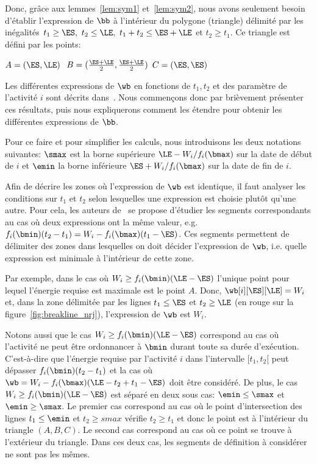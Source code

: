 Donc, grâce aux lemmes~\ref{lem:sym1} et~\ref{lem:sym2}, nous avons
seulement besoin d'établir l'expression de $\bb$ à l'intérieur du
polygone (triangle) délimité par les inégalités $t_1 \ge \ES, \ t_2
\le \LE,\ t_1+t_2 \le \ES+\LE$ et $ t_2 \ge t_1$. Ce triangle est
défini par les points:

$A=(\ES,\LE)$ \hfill $\ B=(\frac{\ES+\LE}{2},\frac{\ES+\LE}{2})$
\hfill $C=( \ES,\ES)$

Les différentes expressions de $\wb$ en fonctions de $t_1,t_2$ et des
paramètre de l'activité $i$ sont décrits
dans~\cite{ArtiguesLopez}. Nous commençons donc par brièvement
présenter ces résultats, puis nous expliquerons comment les étendre
pour obtenir les différentes expressions de $\bb$.

Pour ce faire et pour simplifier les calculs, nous introduisons les
deux notations suivantes: $\smax$ est la borne supérieure $ \LE -
W_i/f_i(\bmax)$ sur la date de début de $i$ et $\emin$ la borne
inférieure $\ES + W_i/f_i(\bmax)$ sur la date de fin de $i$. 

Afin de décrire les zones où l'expression de $\wb$ est identique, il
faut analyser les conditions sur $t_1$ et $t_2$ selon lesquelles une
expression est choisie plutôt qu'une autre. Pour cela, les auteurs
de~\cite{ArtiguesLopez} se propose d'étudier les segments
correspondants au cas où deux expressions ont la même valeur,
e.g. $f_i(\bmin)(t_2-t_1) = W_i - f_i(\bmax) (t_1-\ES)$. Ces segments
permettent de délimiter des zones dans lesquelles on doit décider
l'expression de $\wb$, i.e. quelle expression est minimale à
l'intérieur de cette zone. 

Par exemple, dans le cas où $W_i \ge f_i(\bmin)(\LE -\ES)$ l'unique
point pour lequel l'énergie requise est maximale est le point
$A$. Donc, $\wb[i][\ES][\LE]= W_i$ et, dans la zone délimitée par les
lignes $t_1 \le \ES$ et $t_2 \ge \LE$ (en rouge sur la
figure~\ref{fig:breakline_nrj}), l'expression de $\wb$ est $W_i$. 

Notons aussi que le cas $W_i \ge f_i(\bmin)(\LE -\ES)$ correspond au
cas où l'activité ne peut être ordonnancer à $\bmin$ durant toute sa
durée d'exécution. C'est-à-dire que l'énergie requise par l'activité
$i$ dans l'intervalle $[t_1,t_2[$ peut dépasser $f_i(\bmin)(t_2-t_1)$
et la cas où $\wb= W_i - f_i(\bmax)(\LE-t_2+t_1-\ES)$ doit être
considéré. De plus, le cas $W_i \ge f_i(\bmin)(\LE -\ES)$ est
séparé en deux sous cas: $\emin \le \smax$ et $\emin \ge \smax$. Le
premier cas correspond au cas où le point d'intersection des lignes
$t_1\le \emin$ et $t_2 \ge smax$ vérifie $t_2 \ge t_1$ et donc le
point est à l'intérieur du triangle $(A,B,C)$. Le second cas
correspond au cas où ce point se trouve à l'extérieur du
triangle. Dans ces deux cas, les segments de définition à considérer
ne sont pas les mêmes.

